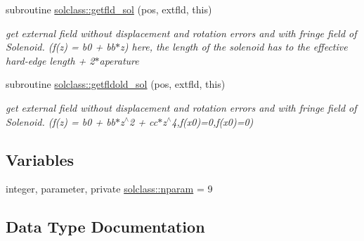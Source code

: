 \begin{DoxyCompactItemize}
subroutine \mbox{\hyperlink{namespacesolclass_a7a865f7ab4470f9bff328ed98aacd7c8}{solclass\+::getfld\+\_\+sol}} (pos, extfld, this)
\begin{DoxyCompactList}\small\item\em get external field without displacement and rotation errors and with fringe field of Solenoid. (f(z) = b0 + bb$\ast$z) here, the length of the solenoid has to the effective hard-\/edge length + 2$\ast$aperature \end{DoxyCompactList}\item 
subroutine \mbox{\hyperlink{namespacesolclass_a592dd58600b2d6df21aab781e8faebac}{solclass\+::getfldold\+\_\+sol}} (pos, extfld, this)
\begin{DoxyCompactList}\small\item\em get external field without displacement and rotation errors and with fringe field of Solenoid. (f(z) = b0 + bb$\ast$z$^\wedge$2 + cc$\ast$z$^\wedge$4,f(x0)=0,f\textquotesingle{}(x0)=0) \end{DoxyCompactList}\end{DoxyCompactItemize}
\subsection*{Variables}
\begin{DoxyCompactItemize}
\item 
integer, parameter, private \mbox{\hyperlink{namespacesolclass_abb5af39a08a5ff2cbe713621b2727eaf}{solclass\+::nparam}} = 9
\end{DoxyCompactItemize}


\subsection{Data Type Documentation}
\label{structsolclass_1_1sol}

